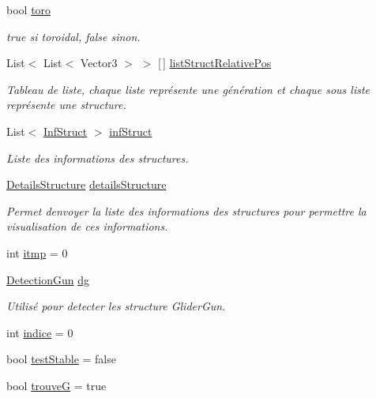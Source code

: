 \begin{DoxyCompactItemize}
bool \mbox{\hyperlink{class_detection_a2f87015f257584e33ceacc6d326fe5af}{toro}}
\begin{DoxyCompactList}\small\item\em true si toroidal, false sinon. \end{DoxyCompactList}\item 
List$<$ List$<$ Vector3 $>$ $>$ \mbox{[}$\,$\mbox{]} \mbox{\hyperlink{class_detection_a8fb631a5ff0dfc9604e0efb5662b98ad}{list\+Struct\+Relative\+Pos}}
\begin{DoxyCompactList}\small\item\em Tableau de liste, chaque liste représente une génération et chaque sous liste représente une structure. \end{DoxyCompactList}\item 
List$<$ \mbox{\hyperlink{class_inf_struct}{Inf\+Struct}} $>$ \mbox{\hyperlink{class_detection_a33e61516c561856189732c12d7182b1e}{inf\+Struct}}
\begin{DoxyCompactList}\small\item\em Liste des informations des structures. \end{DoxyCompactList}\item 
\mbox{\hyperlink{class_details_structure}{Details\+Structure}} \mbox{\hyperlink{class_detection_aa183bc717a4ba8c4371e319eb16fcd23}{details\+Structure}}
\begin{DoxyCompactList}\small\item\em Permet d\textquotesingle{}envoyer la liste des informations des structures pour permettre la visualisation de ces informations. \end{DoxyCompactList}\item 
int \mbox{\hyperlink{class_detection_a8b4cfe5136dffcd0f3196db073042fbe}{itmp}} = 0
\item 
\mbox{\hyperlink{class_detection_gun}{Detection\+Gun}} \mbox{\hyperlink{class_detection_a87f5c7e3ca25b83485fd648d0a512ae5}{dg}}
\begin{DoxyCompactList}\small\item\em Utilisé pour detecter les structure Glider\+Gun. \end{DoxyCompactList}\item 
int \mbox{\hyperlink{class_detection_a530b494dd9b9cc7b028c1ba3334cab5f}{indice}} = 0
\item 
bool \mbox{\hyperlink{class_detection_a960ba0a4d4dce18672dd81aecb63a76c}{test\+Stable}} = false
\item 
bool \mbox{\hyperlink{class_detection_a0f5366777c01d08b01e83e11c1399224}{trouveG}} = true

\end{DoxyCompactItemize}

